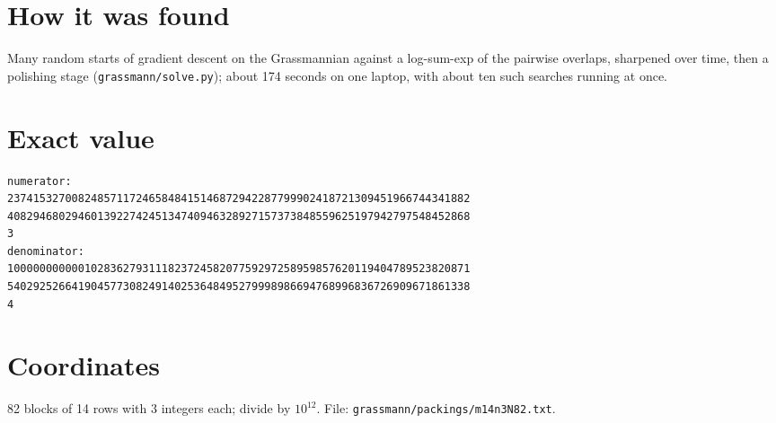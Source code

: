 \documentclass[11pt,a4paper]{article}
\begin{document}
\section{How it was found}
Many random starts of gradient descent on the Grassmannian against a log-sum-exp of the pairwise overlaps, sharpened over time, then a polishing stage (\texttt{grassmann/solve.py}); about 174 seconds on one laptop, with about ten such searches running at once.


\appendix
\section{Exact value}
{\small
\begin{verbatim}
numerator:
237415327008248571172465848415146872942287799902418721309451966744341882
408294680294601392274245134740946328927157373848559625197942797548452868
3
denominator:
100000000000102836279311182372458207759297258959857620119404789523820871
540292526641904577308249140253648495279998986694768996836726909671861338
4
\end{verbatim}}

\section{Coordinates}
82 blocks of 14 rows with 3 integers each; divide by $10^{12}$. File: \texttt{grassmann/packings/m14n3N82.txt}.
{\tiny
\begin{multicols}{3}
\end{multicols}}
\end{document}
